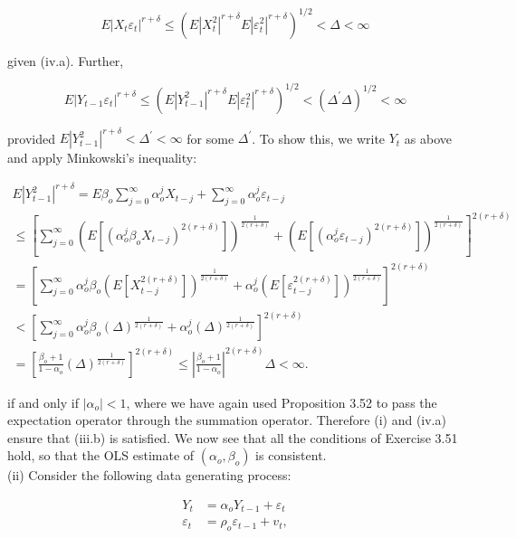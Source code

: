 \documentclass[10pt]{article}
\begin{document}
$$
E\left|X_{t} \varepsilon_{t}\right|^{r+\delta} \leq\left(E\left|X_{t}^{2}\right|^{r+\delta} E\left|\varepsilon_{t}^{2}\right|^{r+\delta}\right)^{1 / 2}<\Delta<\infty
$$

given (iv.a). Further,

$$
E\left|Y_{t-1} \varepsilon_{t}\right|^{r+\delta} \leq\left(E\left|Y_{t-1}^{2}\right|^{r+\delta} E\left|\varepsilon_{t}^{2}\right|^{r+\delta}\right)^{1 / 2}<\left(\Delta^{\prime} \Delta\right)^{1 / 2}<\infty
$$

provided $E\left|Y_{t-1}^{2}\right|^{r+\delta}<\Delta^{\prime}<\infty$ for some $\Delta^{\prime}$. To show this, we write $Y_{t}$ as above and apply Minkowski's inequality:

$$
\begin{gathered}
E\left|Y_{t-1}^{2}\right|^{r+\delta}=E \beta_{o} \sum_{j=0}^{\infty} \alpha_{o}^{j} X_{t-j}+\sum_{j=0}^{\infty} \alpha_{o}^{j} \varepsilon_{t-j} \\
\leq\left[\sum_{j=0}^{\infty}\left(E\left[\left(\alpha_{o}^{j} \beta_{o} X_{t-j}\right)^{2(r+\delta)}\right]\right)^{\frac{1}{2(r+\delta)}}+\left(E\left[\left(\alpha_{o}^{j} \varepsilon_{t-j}\right)^{2(r+\delta)}\right]\right)^{\frac{1}{2(r+\delta)}}\right]^{2(r+\delta)} \\
=\left[\sum_{j=0}^{\infty} \alpha_{o}^{j} \beta_{o}\left(E\left[X_{t-j}^{2(r+\delta)}\right]\right)^{\frac{1}{2(r+\delta)}}+\alpha_{o}^{j}\left(E\left[\varepsilon_{t-j}^{2(r+\delta)}\right]\right)^{\frac{1}{2(r+\delta)}}\right]^{2(r+\delta)} \\
<\left[\sum_{j=0}^{\infty} \alpha_{o}^{j} \beta_{o}(\Delta)^{\frac{1}{2(r+\delta)}}+\alpha_{o}^{j}(\Delta)^{\frac{1}{2(r+\delta)}}\right]^{2(r+\delta)} \\
=\left[\frac{\beta_{o}+1}{1-\alpha_{o}}(\Delta)^{\frac{1}{2(r+\delta)}}\right]^{2(r+\delta)} \leq\left|\frac{\beta_{o}+1}{1-\alpha_{o}}\right|^{2(r+\delta)} \Delta<\infty .
\end{gathered}
$$

if and only if $\left|\alpha_{o}\right|<1$, where we have again used Proposition 3.52 to pass the expectation operator through the summation operator. Therefore (i) and (iv.a) ensure that (iii.b) is satisfied. We now see that all the conditions of Exercise 3.51 hold, so that the OLS estimate of $\left(\alpha_{o}, \beta_{o}\right)$ is consistent.\\
(ii) Consider the following data generating process:

$$
\begin{aligned}
Y_{t} & =\alpha_{o} Y_{t-1}+\varepsilon_{t} \\
\varepsilon_{t} & =\rho_{o} \varepsilon_{t-1}+v_{t},
\end{aligned}
$$
\end{document}
